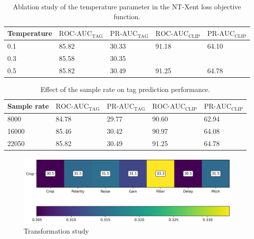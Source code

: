 \begin{table}[t]
    \centering
    \begin{tabular}{lllll}\toprule
    Temperature & $\text{ROC-AUC}_{\text{TAG}}$ & $\text{PR-AUC}_{\text{TAG}}$ & $\text{ROC-AUC}_{\text{CLIP}}$ & $\text{PR-AUC}_{\text{CLIP}}$ \\\midrule
    0.1         & 85.82                         & 30.33                        & 91.18                          & 64.10                         \\
    0.3         & 85.58                         & 30.35                        &                                &                               \\
    0.5         & 85.82                         & 30.49                        & 91.25                          & 64.78 \\                       
    \bottomrule
    \end{tabular}
    \caption{Ablation study of the temperature parameter in the NT-Xent loss objective function.}
    \label{tab:temperature_ablation}
\end{table}

\begin{table}[t]
    \centering
        \begin{tabular}{lllll}\toprule
        Sample rate & $\text{ROC-AUC}_{\text{TAG}}$ & $\text{PR-AUC}_{\text{TAG}}$ & $\text{ROC-AUC}_{\text{CLIP}}$ & $\text{PR-AUC}_{\text{CLIP}}$ \\\midrule
        8000 & 84.78 & 29.77 & 90.60 & 62.94 \\
        16000 & 85.46 & 30.42 & 90.97 & 64.08 \\
        22050 & 85.82 & 30.49 & 91.25 & 64.78 \\                       
        \bottomrule
        \end{tabular}
    \caption{Effect of the sample rate on tag prediction performance.}
    \label{tab:temperature_ablation}
\end{table}

\begin{figure}[t]
    \centering
    \includegraphics[width=\columnwidth]{figs/transformation_study.png}
    \caption{Transformation study}
    \label{fig:transformation_study}
\end{figure}

